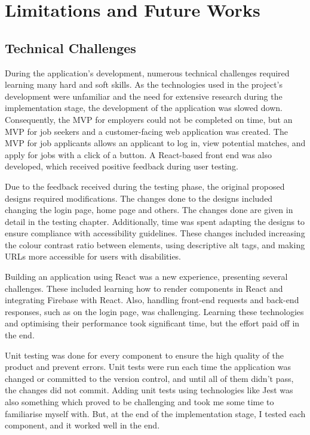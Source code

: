 \chapter{Limitations and Future Works}
\section{Technical Challenges}
During the application's development, numerous technical challenges required learning many hard and soft skills. As the technologies used in the project's development were unfamiliar and the need for extensive research during the implementation stage, the development of the application was slowed down. Consequently, the MVP for employers could not be completed on time, but an MVP for job seekers and a customer-facing web application was created. The MVP for job applicants allows an applicant to log in, view potential matches, and apply for jobs with a click of a button. A React-based front end was also developed, which received positive feedback during user testing.

Due to the feedback received during the testing phase, the original proposed designs required modifications. The changes done to the designs included changing the login page, home page and others. The changes done are given in detail in the testing chapter. Additionally, time was spent adapting the designs to ensure compliance with accessibility guidelines. These changes included increasing the colour contrast ratio between elements, using descriptive alt tags, and making URLs more accessible for users with disabilities.

Building an application using React was a new experience, presenting several challenges. These included learning how to render components in React and integrating Firebase with React. Also, handling front-end requests and back-end responses, such as on the login page, was challenging. Learning these technologies and optimising their performance took significant time, but the effort paid off in the end.

Unit testing was done for every component to ensure the high quality of the product and prevent errors. Unit tests were run each time the application was changed or committed to the version control, and until all of them didn't pass, the changes did not commit. Adding unit tests using technologies like Jest was also something which proved to be challenging and took me some time to familiarise myself with. But, at the end of the implementation stage, I tested each component, and it worked well in the end. 

